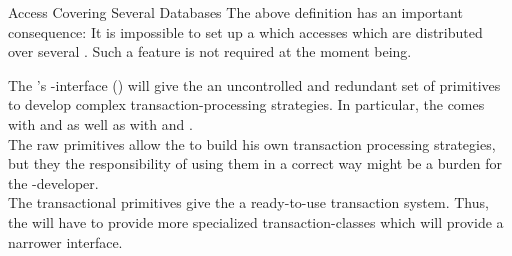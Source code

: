\documentclass[a4paper, 12pt]{book}
\begin{document}
\begin{remark*}{Access Covering Several Databases}
  The above definition has an important consequence: It is impossible to set
  up a  which accesses  which are distributed
  over several .
  Such a feature is not required at the moment being.
\end{remark*}


The \SYNEIGHT's -interface (\TRANSACTION) will give the
 an uncontrolled and redundant set of primitives to develop complex
transaction-processing strategies.
%
In particular, the \TRANSACTION comes with  and  as well as with  and
.\\
The raw primitives allow the  to build his own transaction
processing strategies, but they the responsibility of using them in a
  correct way might be a burden for the -developer.\\
The transactional primitives give the  a ready-to-use transaction
system.
%
Thus, the \SYNEIGHT will have to provide more specialized
transaction-classes which will provide a narrower interface.
%
%

\end{document}
